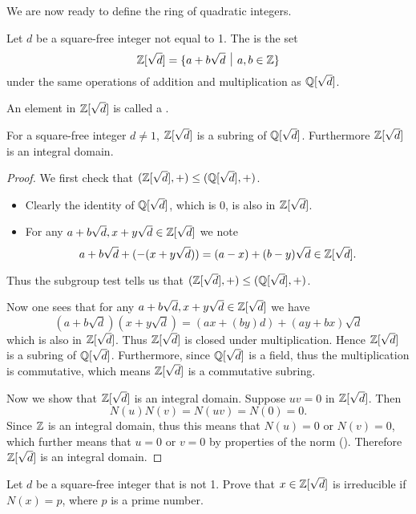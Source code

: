 We are now ready to define the ring of quadratic integers.
\begin{definition}
    Let $d$ be a square-free integer not equal to 1. The  is the set
    \[
        \Z[\sqrt{d}] = \{a + b\sqrt{d} \vert a,b\in\Z\}
    \]
    under the same operations of addition and multiplication as $\mathbb{Q}[\sqrt{d}]$.

    An element in $\mathbb{Z}[\sqrt{d}]$ is called a .
\end{definition}
\begin{proposition}
    For a square-free integer $d \neq 1$, $\mathbb{Z}[\sqrt{d}]$ is a subring of $\mathbb{Q}[\sqrt{d}]$. Furthermore $\mathbb{Z}[\sqrt{d}]$ is an integral domain.
\end{proposition}
\begin{proof}
    We first check that $(\mathbb{Z}[\sqrt{d}], +) \leq (\mathbb{Q}[\sqrt{d}], +)$.
    \begin{itemize}
        \item Clearly the identity of $\mathbb{Q}[\sqrt{d}]$, which is 0, is also in $\mathbb{Z}[\sqrt{d}]$.
        \item For any $a+b\sqrt{d}, x+y\sqrt{d} \in \mathbb{Z}[\sqrt{d}]$ we note
        \[
            a + b\sqrt{d} + (-(x+y\sqrt{d})) = (a-x) + (b-y)\sqrt{d} \in \mathbb{Z}[\sqrt{d}].
        \]
    \end{itemize}
    Thus the subgroup test tells us that $(\mathbb{Z}[\sqrt{d}], +) \leq (\mathbb{Q}[\sqrt{d}], +)$.

    Now one sees that for any $a+b\sqrt{d}, x+y\sqrt{d} \in \mathbb{Z}[\sqrt{d}]$ we have
    \[
        (a+b\sqrt{d})(x+y\sqrt{d}) = (ax+(by)d) + (ay+bx)\sqrt{d}
    \]
    which is also in $\mathbb{Z}[\sqrt{d}]$. Thus $\mathbb{Z}[\sqrt{d}]$ is closed under multiplication. Hence $\mathbb{Z}[\sqrt{d}]$ is a subring of $\mathbb{Q}[\sqrt{d}]$. Furthermore, since $\mathbb{Q}[\sqrt{d}]$ is a field, thus the multiplication is commutative, which means $\mathbb{Z}[\sqrt{d}]$ is a commutative subring.

    Now we show that $\mathbb{Z}[\sqrt{d}]$ is an integral domain. Suppose $uv = 0$ in $\mathbb{Z}[\sqrt{d}]$. Then
    \[
        N(u)N(v) = N(uv) = N(0) = 0.
    \]
    Since $\mathbb{Z}$ is an integral domain, thus this means that $N(u) = 0$ or $N(v) = 0$, which further means that $u = 0$ or $v = 0$ by properties of the norm (). Therefore $\mathbb{Z}[\sqrt{d}]$ is an integral domain.
\end{proof}

\begin{exercise}\label{exercise-quadratic-integer-irreducible-if-norm-is-prime}
    Let $d$ be a square-free integer that is not 1. Prove that $x \in \mathbb{Z}[\sqrt{d}]$ is irreducible if $N(x) = p$, where $p$ is a prime number.
\end{exercise}

